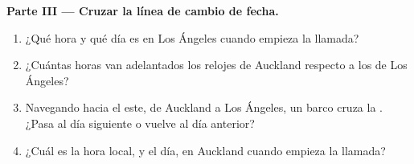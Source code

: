 \begin{problem}
\medskip
\noindent\textbf{Parte III --- Cruzar la línea de cambio de fecha.}
\begin{enumerate}[resume]
  \item ¿Qué hora y qué día es en Los Ángeles cuando empieza la llamada?
  \item ¿Cuántas horas van adelantados los relojes de Auckland respecto a
        los de Los Ángeles?
  \item Navegando hacia el este, de Auckland a Los Ángeles, un barco cruza
        la . ¿Pasa al día siguiente o vuelve al día
        anterior?
  \item ¿Cuál es la hora local, y el día, en Auckland cuando empieza la
        llamada?
\end{enumerate}
\end{problem}
